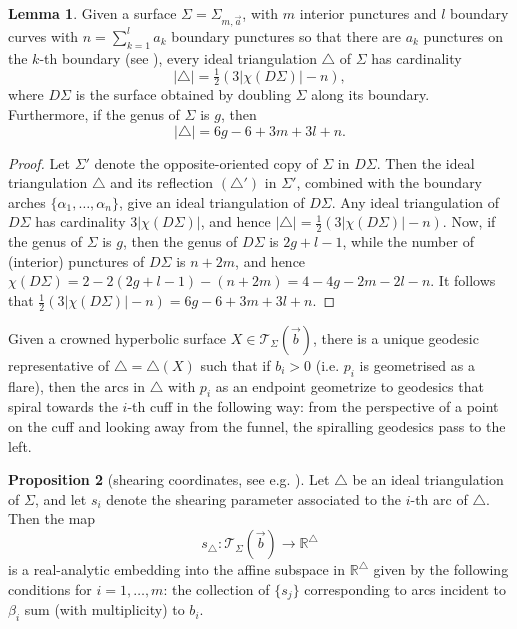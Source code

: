 \documentclass{amsart}
\newcommand{\RR}{\mathbb{R}}
\theoremstyle{definition}
\newtheorem{proposition}{Proposition}[section]
\newtheorem{lemma}[proposition]{Lemma}
\begin{document}
\begin{lemma}
Given a surface $\Sigma=\Sigma_{m,\vec{a}}$, 
with $m$ interior punctures and $l$ boundary curves with $n=\sum_{k=1}^l a_k$ boundary punctures so that there are $a_k$ punctures on the $k$-th boundary (see ), every ideal triangulation $\triangle$ of $\Sigma$ has cardinality
\[
|\triangle|=\tfrac{1}{2}(3|\chi(D\Sigma)|-n),
\]  
where $D\Sigma$ is the surface obtained by doubling $\Sigma$ along its boundary. Furthermore, if the genus of $\Sigma$ is $g$, then
\[
|\triangle|=6g-6+3m+3l+n.
\]
\end{lemma}
\begin{proof}
Let $\Sigma'$ denote the opposite-oriented copy of $\Sigma$ in $D\Sigma$. Then the ideal triangulation $\triangle$ and its reflection $(\triangle')$ in $\Sigma'$, combined with the boundary arches $\{\alpha_1,\ldots,\alpha_n\}$, give an ideal triangulation of $D\Sigma$. Any ideal triangulation of $D\Sigma$ has cardinality $3|\chi(D\Sigma)|$, and hence $
|\triangle|=\frac{1}{2}(3|\chi(D\Sigma)|-n)
$. Now, if the genus of $\Sigma$ is $g$, then the genus of $D\Sigma$ is $2g+l-1$, while the number of (interior) punctures of $D\Sigma$ is $n+2m$, and hence $\chi(D\Sigma) = 2-2(2g+l-1)-(n+2m) = 4 - 4g -2m -2l-n$. It follows that $\frac{1}{2}(3|\chi(D\Sigma)|-n) = 6g-6+3m+3l+n$.
\end{proof}

Given a crowned hyperbolic surface $X \in \mathcal{T}_{\Sigma}(\vec{b})$, there is a unique geodesic representative of $\triangle=\triangle(X)$ such that if $b_i>0$ (i.e. $p_i$ is geometrised as a flare), then the arcs in $\triangle$ with $p_i$ as an endpoint geometrize to geodesics that spiral towards the $i$-th cuff in the following way: from the perspective of a point on the cuff and looking away from the funnel, the spiralling geodesics pass to the left. 



\begin{proposition}[shearing coordinates, see e.g. {\cite[Cor~2.22]{huang_thesis}}]
\label{prop:shearingcoords}
Let  $\triangle$ be an ideal triangulation of $\Sigma$, and let $s_i$ denote the shearing parameter associated to the $i$-th arc of $\triangle$. Then the map 
\[
s_{\triangle} : \mathcal{T}_{\Sigma}(\vec{b}) \to\RR^{\triangle} 
\]
is a real-analytic embedding into the affine subspace in $\RR^{\triangle} $ given by the following conditions for $i=1,\dotsc,m$: the collection of $\{s_j\}$ corresponding to arcs incident to $\beta_i$ sum (with multiplicity) to $b_i$.
\end{proposition}
\end{document}

